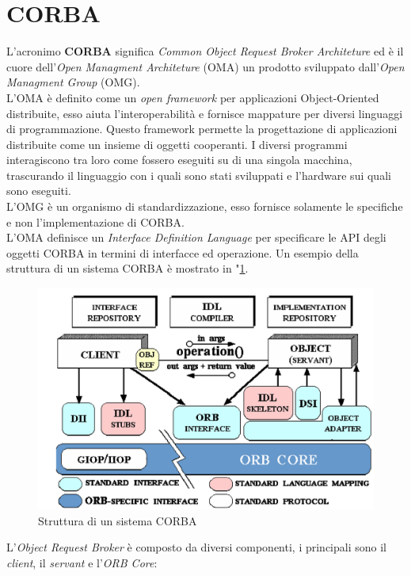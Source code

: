 \section{CORBA}\label{capitolo3}
L'acronimo \textbf{CORBA} significa \emph{Common Object Request Broker Architeture} ed è il cuore dell'\emph{Open Managment Architeture} (OMA) un prodotto sviluppato dall'\emph{Open Managment Group} (OMG).\\
L'OMA è definito come un \emph{open framework} per applicazioni Object-Oriented distribuite, esso aiuta l'interoperabilità e fornisce mappature per diversi linguaggi di programmazione. Questo framework permette la progettazione di applicazioni distribuite come un insieme di oggetti cooperanti. I diversi programmi interagiscono tra loro come fossero eseguiti su di una singola macchina, trascurando il linguaggio con i quali sono stati sviluppati e l'hardware sui quali sono eseguiti.\\
L'OMG è un organismo di standardizzazione, esso fornisce solamente le specifiche e non l'implementazione di CORBA.\\
L'OMA definisce un \emph{Interface Definition Language} per specificare le API degli oggetti CORBA in termini di interfacce ed operazione. Un esempio della struttura di un sistema CORBA è mostrato in \figurename"\ref{fig:orb}.
\begin{figure}
\centering
\includegraphics[width=0.7\linewidth]{img/orb}
\caption{Struttura di un sistema CORBA}
\label{fig:orb}
\end{figure}
L'\emph{Object Request Broker} è composto da diversi componenti, i principali sono il \emph{client}, il \emph{servant} e l'\emph{ORB Core}:

